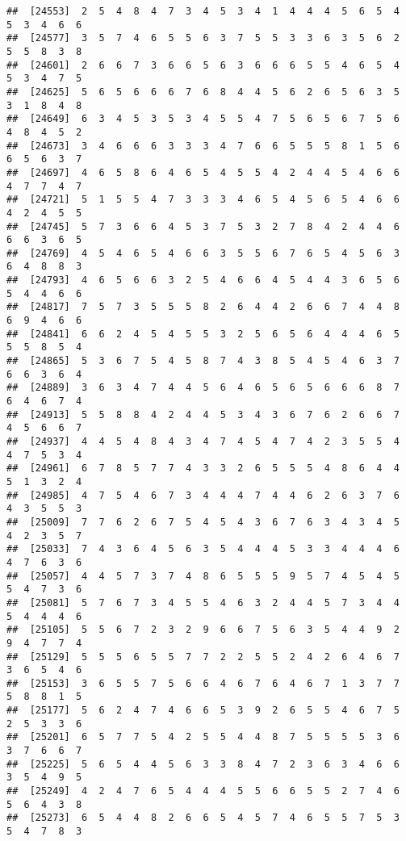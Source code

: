\documentclass[
]{book}
\begin{document}
\begin{verbatim}
##  [24553]  2  5  4  8  4  7  3  4  5  3  4  1  4  4  4  5  6  5  4  5  3  4  6  6
##  [24577]  3  5  7  4  6  5  5  6  3  7  5  5  3  3  6  3  5  6  2  5  5  8  3  8
##  [24601]  2  6  6  7  3  6  6  5  6  3  6  6  6  5  5  4  6  5  4  5  3  4  7  5
##  [24625]  5  6  5  6  6  6  7  6  8  4  4  5  6  2  6  5  6  3  5  3  1  8  4  8
##  [24649]  6  3  4  5  3  5  3  4  5  5  4  7  5  6  5  6  7  5  6  4  8  4  5  2
##  [24673]  3  4  6  6  6  3  3  3  4  7  6  6  5  5  5  8  1  5  6  6  5  6  3  7
##  [24697]  4  6  5  8  6  4  6  5  4  5  5  4  2  4  4  5  4  6  6  4  7  7  4  7
##  [24721]  5  1  5  5  4  7  3  3  3  4  6  5  4  5  6  5  4  6  6  4  2  4  5  5
##  [24745]  5  7  3  6  6  4  5  3  7  5  3  2  7  8  4  2  4  4  6  6  6  3  6  5
##  [24769]  4  5  4  6  5  4  6  6  3  5  5  6  7  6  5  4  5  6  3  6  4  8  8  3
##  [24793]  4  6  5  6  6  3  2  5  4  6  6  4  5  4  4  3  6  5  6  5  4  4  6  6
##  [24817]  7  5  7  3  5  5  5  8  2  6  4  4  2  6  6  7  4  4  8  6  9  4  6  6
##  [24841]  6  6  2  4  5  4  5  5  3  2  5  6  5  6  4  4  4  6  5  5  5  8  5  4
##  [24865]  5  3  6  7  5  4  5  8  7  4  3  8  5  4  5  4  6  3  7  6  6  3  6  4
##  [24889]  3  6  3  4  7  4  4  5  6  4  6  5  6  5  6  6  6  8  7  6  4  6  7  4
##  [24913]  5  5  8  8  4  2  4  4  5  3  4  3  6  7  6  2  6  6  7  4  5  6  6  7
##  [24937]  4  4  5  4  8  4  3  4  7  4  5  4  7  4  2  3  5  5  4  4  7  5  3  4
##  [24961]  6  7  8  5  7  7  4  3  3  2  6  5  5  5  4  8  6  4  4  5  1  3  2  4
##  [24985]  4  7  5  4  6  7  3  4  4  4  7  4  4  6  2  6  3  7  6  4  3  5  5  3
##  [25009]  7  7  6  2  6  7  5  4  5  4  3  6  7  6  3  4  3  4  5  4  2  3  5  7
##  [25033]  7  4  3  6  4  5  6  3  5  4  4  4  5  3  3  4  4  4  6  4  7  6  3  6
##  [25057]  4  4  5  7  3  7  4  8  6  5  5  5  9  5  7  4  5  4  5  5  4  7  3  6
##  [25081]  5  7  6  7  3  4  5  5  4  6  3  2  4  4  5  7  3  4  4  5  4  4  4  6
##  [25105]  5  5  6  7  2  3  2  9  6  6  7  5  6  3  5  4  4  9  2  9  4  7  7  4
##  [25129]  5  5  5  6  5  5  7  7  2  2  5  5  2  4  2  6  4  6  7  3  6  5  4  6
##  [25153]  3  6  5  5  7  5  6  6  4  6  7  6  4  6  7  1  3  7  7  5  8  8  1  5
##  [25177]  5  6  2  4  7  4  6  6  5  3  9  2  6  5  5  4  6  7  5  2  5  3  3  6
##  [25201]  6  5  7  7  5  4  2  5  5  4  4  8  7  5  5  5  5  3  6  3  7  6  6  7
##  [25225]  5  6  5  4  4  5  6  3  3  8  4  7  2  3  6  3  4  6  6  3  5  4  9  5
##  [25249]  4  2  4  7  6  5  4  4  4  5  5  6  6  5  5  2  7  4  6  5  6  4  3  8
##  [25273]  6  5  4  4  8  2  6  6  5  4  5  7  4  6  5  5  7  5  3  5  4  7  8  3

\end{verbatim}
\end{document}

